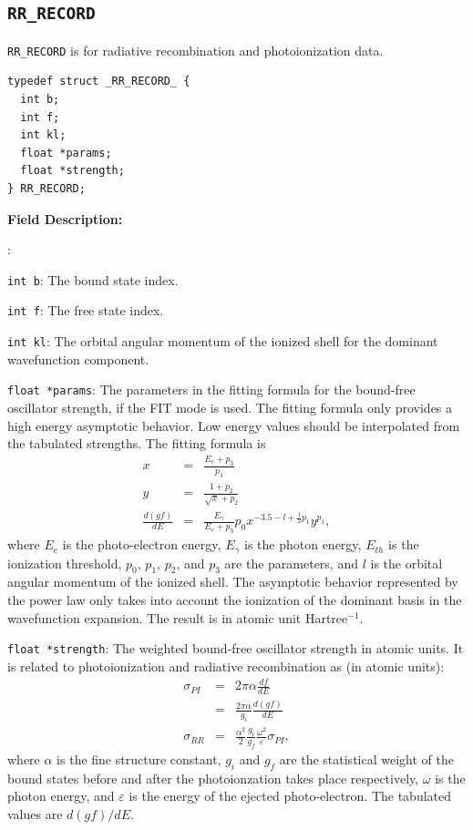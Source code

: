 \documentclass[twoside,letterpaper]{refrep}
\newenvironment{dbdesc}{\textbf{Field Description:} \begin{list}
	{:}{\setlength{\labelwidth}{2in}
	   \setlength{\leftmargin}{2in}
	   \setlength{\labelsep}{0.1in}
	   \setlength{\rightmargin}{0.2in}}}
	{\end{list}}
\begin{document}
\subsection{\texttt{RR\_RECORD}}
\texttt{RR\_RECORD} is for radiative recombination and photoionization data.

\begin{verbatim}
typedef struct _RR_RECORD_ {
  int b;
  int f;
  int kl;
  float *params;
  float *strength;
} RR_RECORD;
\end{verbatim}

\begin{dbdesc}
\item[\texttt{int b}:] The bound state index.
\item[\texttt{int f}:] The free state index.
\item[\texttt{int kl}:] The orbital angular momentum of the ionized shell for
the dominant wavefunction component.
\item[\texttt{float *params}:] The parameters in the fitting formula for the
bound-free oscillator strength, if the FIT mode is
used. The fitting formula only provides a high energy asymptotic behavior. Low
energy values should be interpolated from the tabulated strengths. The fitting
formula is
\begin{eqnarray}
x &=& \frac{E_e+p_3}{p_3} \nonumber\\
y &=& \frac{1+p_2}{\sqrt{x}+p_2} \nonumber\\
\frac{d(gf)}{dE} &=&
\frac{E_\gamma}{E_e+p_3}p_0x^{-3.5-l+\frac{1}{2}p_1}y^{p_1}, 
\end{eqnarray}
where $E_e$ is the photo-electron energy, $E_\gamma$ is the photon energy,
$E_{th}$ is the ionization threshold, $p_0$, $p_1$, $p_2$, and $p_3$ are the
parameters, and $l$ is the orbital angular momentum of the ionized
shell. The asymptotic behavior represented by the power law only takes into
account the ionization of the dominant basis in the wavefunction
expansion. The result is in atomic unit Hartree$^{-1}$.
\item[\texttt{float *strength}:] The weighted bound-free oscillator strength in
atomic units. It is related to photoionization and radiative recombination as
(in atomic units):
\begin{eqnarray}
\sigma_{PI} &=& 2\pi\alpha\frac{ d f}{ d E} \nonumber\\
            &=& \frac{2\pi\alpha}{g_i}\frac{d(gf)}{d E} \nonumber\\
\sigma_{RR} &=& \frac{\alpha^2}{2}\frac{g_i}{g_f}\frac{\omega^2}{\varepsilon}
\sigma_{PI},
\end{eqnarray}
where $\alpha$ is the fine structure constant, $g_i$ and $g_f$ are the
statistical weight of the bound states before and after the photoionzation
takes place respectively, $\omega$ is the photon energy, and $\varepsilon$ is
the energy of the ejected photo-electron. The tabulated values are $d(gf)/dE$.
\end{dbdesc}
\end{document}
